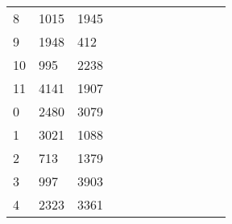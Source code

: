 \begin{table}[tb]
\begin{tabular}{|l|l|l|lllllllll}
		8  & 1015 & 1945 &                           &                           &                           &                           &                           &                           &                          &                          &                           \\ \cline{1-3}
		9  & 1948 & 412  &                           &                           &                           &                           &                           &                           &                          &                          &                           \\ \cline{1-3}
		10 & 995  & 2238 &                           &                           &                           &                           &                           &                           &                          &                          &                           \\ \cline{1-3}
		11 & 4141 & 1907 &                           &                           &                           &                           &                           &                           &                          &                          &                           \\ \cline{1-3}
		0  & 2480 & 3079 &                           &                           &                           &                           &                           &                           &                          &                          &                           \\ \cline{1-3}
		1  & 3021 & 1088 &                           &                           &                           &                           &                           &                           &                          &                          &                           \\ \cline{1-3}
		2  & 713  & 1379 &                           &                           &                           &                           &                           &                           &                          &                          &                           \\ \cline{1-3}
		3  & 997  & 3903 &                           &                           &                           &                           &                           &                           &                          &                          &                           \\ \cline{1-3}
		4  & 2323 & 3361 &                           &                           &                           &                           &                           &                           &                          &                          &                           \\ \cline{1-3}

\end{tabular}
\end{table}
